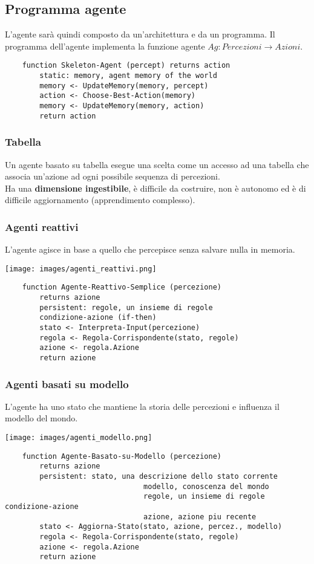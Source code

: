 \subsection{Programma agente}
L'agente sarà quindi composto da un'architettura e da un programma. Il programma dell'agente implementa la funzione agente $Ag: Percezioni \to Azioni$. 

\begin{lstlisting}
	function Skeleton-Agent (percept) returns action
		static: memory, agent memory of the world
		memory <- UpdateMemory(memory, percept)
		action <- Choose-Best-Action(memory)
		memory <- UpdateMemory(memory, action)
		return action
\end{lstlisting}

\subsubsection{Tabella}
Un agente basato su tabella esegue una scelta come un accesso ad una tabella che associa un'azione ad ogni possibile sequenza di percezioni.\\
Ha una \textbf{dimensione ingestibile}, è difficile da costruire, non è autonomo ed è di difficile aggiornamento (apprendimento complesso).

\subsubsection{Agenti reattivi}
L'agente agisce in base a quello che percepisce senza salvare nulla in memoria.
\begin{center}
	\texttt{[image: images/agenti\_reattivi.png]}
\end{center}
\begin{lstlisting}
	function Agente-Reattivo-Semplice (percezione)
		returns azione
		persistent: regole, un insieme di regole
		condizione-azione (if-then)
		stato <- Interpreta-Input(percezione)
		regola <- Regola-Corrispondente(stato, regole)
		azione <- regola.Azione
		return azione
\end{lstlisting}

\subsubsection{Agenti basati su modello}
L'agente ha uno stato che mantiene la storia delle percezioni e influenza il modello del mondo.
\begin{center}
	\texttt{[image: images/agenti\_modello.png]}
\end{center}
\begin{lstlisting}
	function Agente-Basato-su-Modello (percezione)
		returns azione
		persistent: stato, una descrizione dello stato corrente
								modello, conoscenza del mondo
								regole, un insieme di regole condizione-azione
								azione, azione piu recente
		stato <- Aggiorna-Stato(stato, azione, percez., modello)
		regola <- Regola-Corrispondente(stato, regole)
		azione <- regola.Azione
		return azione
\end{lstlisting}

